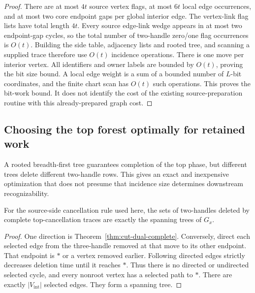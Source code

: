 \begin{proof}
There are at most $4t$ source vertex flags, at most $6t$ local edge
occurrences, and at most two core endpoint gaps per global interior edge.
The vertex-link flag lists have total length $4t$.  Every source edge-link
wedge appears in at most two endpoint-gap cycles, so the total number of
two-handle zero/one flag occurrences is $O(t)$.  Building the side table,
adjacency lists and rooted tree, and scanning a supplied trace therefore
use $O(t)$ incidence operations.  There is one move per interior vertex.
All identifiers and owner labels are bounded by $O(t)$, proving the bit
size bound.  A local edge weight is a sum of a bounded number of
$L$-bit coordinates, and the finite chart scan has $O(t)$ such operations.
This proves the bit-work bound.  It does not identify the cost of the
existing source-preparation routine with this already-prepared graph cost.
\end{proof}

\subsection{Choosing the top forest optimally for retained work}

A rooted breadth-first tree guarantees completion of the top phase, but
different trees delete different two-handle rows.  This gives an exact
and inexpensive optimization that does not presume that incidence size
determines downstream recognizability.

\begin{proposition}
\label{prop:cut-dual-tree-sets}
For the source-side cancellation rule used here, the sets of two-handles
deleted by complete top-cancellation traces are exactly the spanning
trees of $G_x$.
\end{proposition}

\begin{proof}
One direction is Theorem~\ref{thm:cut-dual-complete}.  Conversely, direct
each selected edge from the three-handle removed at that move to its
other endpoint.  That endpoint is $\ast$ or a vertex removed earlier.
Following directed edges strictly decreases deletion time until it
reaches $\ast$.  Thus there is no directed or undirected selected cycle,
and every nonroot vertex has a selected path to $\ast$.  There are exactly
$|V_{\mathrm{int}}|$ selected edges.  They form a spanning tree.
\end{proof}

